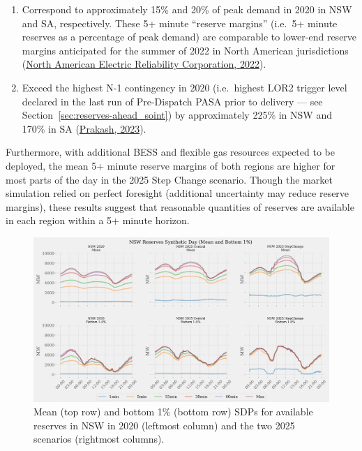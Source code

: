 \documentclass[12pt,a4paper,]{report}
\providecommand{\tightlist}{%
  \setlength{\itemsep}{0pt}\setlength{\parskip}{0pt}}
\begin{document}
\begin{enumerate}
\def\labelenumi{\arabic{enumi}.}
\tightlist
\item
  Correspond to approximately 15\% and 20\% of peak demand in 2020 in
  NSW and SA, respectively. These 5+ minute ``reserve margins'' (i.e.~5+
  minute reserves as a percentage of peak demand) are comparable to
  lower-end reserve margins anticipated for the summer of 2022 in North
  American jurisdictions
  (\protect\hyperlink{ref-northamericanelectricreliabilitycorporation2022SummerReliability2022}{North
  American Electric Reliability Corporation, 2022}).
\item
  Exceed the highest N-1 contingency in 2020 (i.e.~highest LOR2 trigger
  level declared in the last run of Pre-Dispatch PASA prior to delivery
  --- see Section~\ref{sec:reserves-ahead_soint}) by approximately 225\%
  in NSW and 170\% in SA
  (\protect\hyperlink{ref-prakashNEMSEER2023}{Prakash, 2023}).
\end{enumerate}

Furthermore, with additional BESS and flexible gas resources expected to
be deployed, the mean 5+ minute reserve margins of both regions are
higher for most parts of the day in the 2025 Step Change scenario.
Though the market simulation relied on perfect foresight (additional
uncertainty may reduce reserve margins), these results suggest that
reasonable quantities of reserves are available in each region within a
5+ minute horizon.

\begin{figure}
\hypertarget{fig:nswreserves}{%
\centering
\includegraphics[width=1\textwidth,height=\textheight]{./source/figures/NSW_reserves_all_profiles_by_di.png}
\caption[NSW available reserves SDPs]{Mean (top row) and bottom 1\%
(bottom row) SDPs for available reserves in NSW in 2020 (leftmost
column) and the two 2025 scenarios (rightmost
columns).}\label{fig:nswreserves}
}
\end{figure}
\end{document}
